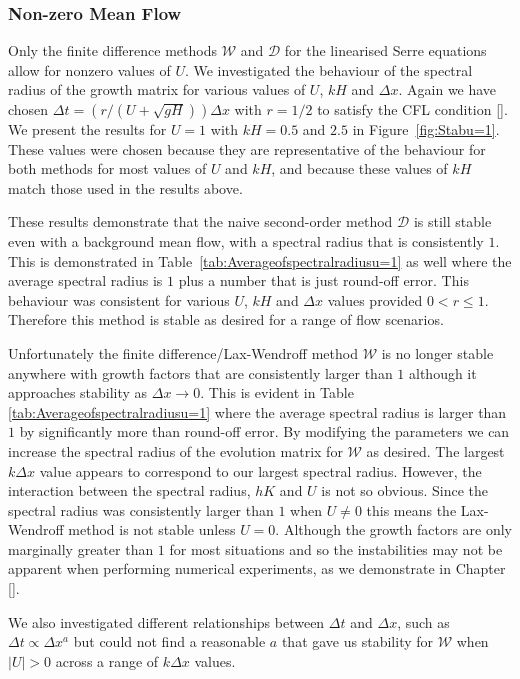 \subsubsection{Non-zero Mean Flow}
Only the finite difference methods $\mathcal{W}$ and $\mathcal{D}$ for the linearised Serre equations allow for nonzero values of $U$. We investigated the behaviour of the spectral radius of the growth matrix for various values of $U$, $kH$ and $\Delta x$. Again we have chosen $\Delta t =   \left( r / \left(U + \sqrt{gH}\right) \right) {\Delta x} $ with $r= 1/2$ to satisfy the CFL condition []. We present the results for $U =1$ with $kH =0.5$ and $2.5$ in Figure~\ref{fig:Stabu=1}. These values were chosen because they are representative of the behaviour for both methods for most values of $U$ and $kH$, and because these values of $kH$ match those used in the results above.

These results demonstrate that the naive second-order method $\mathcal{D}$ is still stable even with a background mean flow, with a spectral radius that is consistently $1$. This is demonstrated in Table~\ref{tab:Averageofspectralradiusu=1} as well where the average spectral radius is $1$ plus a number that is just round-off error. This behaviour was consistent for various $U$, $kH$ and $\Delta x$ values provided $0 < r \le 1$. Therefore this method is stable as desired for a range of flow scenarios. 

Unfortunately the finite difference/Lax-Wendroff method $\mathcal{W}$ is no longer stable anywhere with growth factors that are consistently larger than $1$ although it approaches stability as $\Delta x \rightarrow 0$. This is evident in Table \ref{tab:Averageofspectralradiusu=1} where the average spectral radius is larger than $1$ by significantly more than round-off error. By modifying the parameters we can increase the spectral radius of the evolution matrix for $\mathcal{W}$ as desired. The largest $k\Delta x$ value appears to correspond to our largest spectral radius. However, the interaction between the spectral radius, $hK$ and $U$ is not so obvious. Since the spectral radius was consistently larger than $1$ when $U \neq 0$ this means the Lax-Wendroff method is not stable unless $U=0$. Although the growth factors are only marginally greater than $1$ for most situations and so the instabilities may not be apparent when performing numerical experiments, as we demonstrate in Chapter []. 

We also investigated different relationships between $\Delta t$ and $\Delta x$, such as $\Delta t \propto \Delta x^a$ but could not find a reasonable $a$ that gave us stability for $\mathcal{W}$ when $|U| > 0$ across a range of $k\Delta x$ values.



